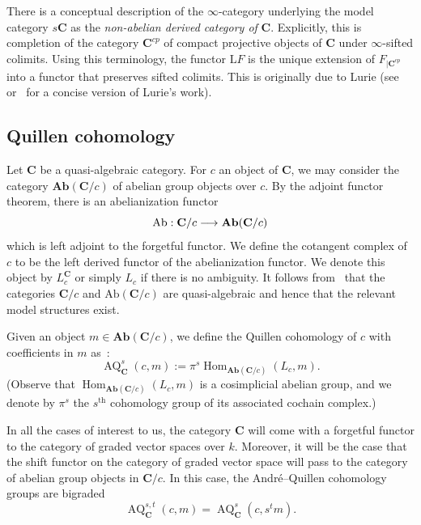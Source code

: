 \documentclass[AHL,Unicode,longabstracts,published]{cedram}
\renewcommand{\rm}[1]{{\mathrm{#1}}}
\DeclareMathOperator{\Hom}{Hom}
\DeclareMathOperator{\AQ}{AQ}
\newcommand{\bAb}{\mathbf{Ab}}
\newcommand{\rAb}{\mathrm{Ab}}
\newcommand{\bfC}{\mathbf{C}}
\renewcommand{\L}{\mathrm{L}}
\renewcommand*{\to}{\mathchoice{\longrightarrow}{\rightarrow}{\rightarrow}{\rightarrow}}
\begin{document}
\begin{rema}\label{remark : non-abelian derived}
There is a conceptual description of the $\infty$-category underlying the model category $s\bfC$ as the \emph{non-abelian derived category of} $\bfC$. Explicitly, this is completion of the category $\bfC^{cp}$ of compact projective objects of $\bfC$ under $\infty$-sifted colimits. Using this terminology, the functor $\L F$ is the unique extension of $F_{|\bfC^{cp}}$ into a functor that preserves sifted colimits. This is originally due to Lurie (see~\cite[Section~5.5.8]{luriehigher} or~\cite[Section~5.1.1]{kestupurity} for a concise version of Lurie's work).
\end{rema}


\subsection{Quillen cohomology}

Let $\bfC$ be a quasi-algebraic category. For $c$ an object of $\bfC$, we may consider the category $\bAb(\bfC/c)$ of abelian group objects over $c$. By the adjoint functor theorem, there is an abelianization functor
\[
\rAb: \bfC/c\to\bAb(\bfC/c)
\]
which is left adjoint to the forgetful functor. We define the cotangent complex of $c$ to be the left derived functor of the abelianization functor. We denote this object by $L_c^{\bfC}$ or simply $L_c$ if there is no ambiguity. It follows from~\cite[Propositions~3.33 and 3.34]{franklandbehavior} that the categories $\bfC/c$ and $\rAb(\bfC/c)$ are quasi-algebraic and hence that the relevant model structures exist.

Given an object $m\in\bAb(\bfC/c)$, we define the Quillen cohomology of $c$ with coefficients in $m$ as~:
\[
\AQ^s_{\bfC}(c,m):=\pi^s\Hom_{\bAb(\bfC/c)}(L_c,m).
\]
(Observe that $\Hom_{\bAb(\bfC/c)}(L_c,m)$ is a cosimplicial abelian group, and we denote by $\pi^s$ the $s^{\rm{th}}$ cohomology group of its associated cochain complex.)

\begin{rema}
In all the cases of interest to us, the category $\bfC$ will come with a forgetful functor to the category of graded vector spaces over $k$. Moreover, it will be the case that the shift functor on the category of graded vector space will pass to the category of abelian group objects in $\bfC/c$. In this case, the André--Quillen cohomology groups are bigraded
\[
\AQ^{s,t}_{\bfC}(c,m)=\AQ^s_{\bfC}(c,s^tm).
\]
\end{rema}
\end{document}

